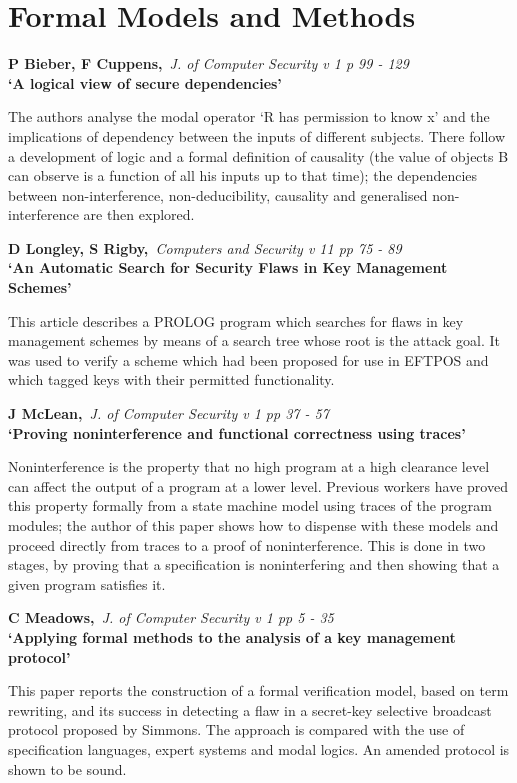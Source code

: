 \pagebreak

\normalsize
\section{Formal Models and Methods}
\small

{\bf \noindent P Bieber, F Cuppens,}{\em ~J. of Computer Security v 1 p 99 -
129\\}
{\bf `A logical view of secure dependencies'}

The authors analyse the modal operator `R has permission to know x' and the
implications of dependency between the inputs of different subjects. There
follow a development of logic and a formal definition of causality (the value
of objects B can observe is a function of all his inputs up to that time);
the dependencies between non-interference, non-deducibility, causality and 
generalised non-interference are then explored.

{\bf \noindent D Longley, S Rigby,}{\em ~Computers and Security v 11 pp 75
- 89\\}
{\bf `An Automatic Search for Security Flaws in Key Management Schemes'}

This article describes a PROLOG program which searches for flaws in key 
management schemes by means of a search tree whose root is the attack goal.
It was used to verify a scheme which had been proposed for use in EFTPOS
and which tagged keys with their permitted functionality.

{\bf \noindent J McLean,}{\em ~J. of Computer Security v 1 pp 37 - 57\\}
{\bf `Proving noninterference and functional correctness using traces'}

Noninterference is the property that no high program at a high clearance 
level can affect the output of a program at a lower level. Previous workers
have proved this property formally from a state machine model using traces
of the program modules; the author of this paper shows how to dispense with 
these models and proceed directly from traces to a proof of noninterference. 
This is done in two stages, by proving that a specification is noninterfering
and then showing that a given program satisfies it.

{\bf \noindent C Meadows,}{\em ~J. of Computer Security v 1 pp 5 - 35\\}
{\bf `Applying formal methods to the analysis of a key management protocol'}

This paper reports the construction of a formal verification model, based on
term rewriting, and its success in detecting a flaw in a secret-key selective 
broadcast protocol proposed by Simmons. The approach is compared with the use 
of specification languages, expert systems and modal logics. An amended 
protocol is shown to be sound.

